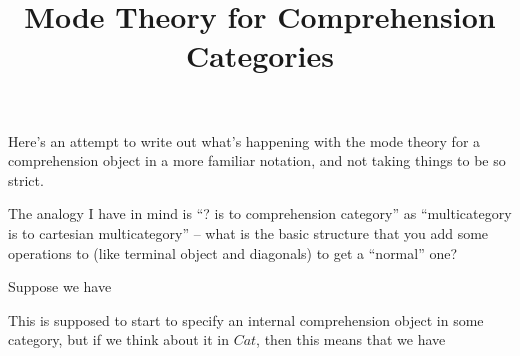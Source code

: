 \documentclass[10pt]{article}
\title{Mode Theory for Comprehension Categories}
\date{}
\theoremstyle{definition}
\let\emptyset\varnothing
\begin{document}
\maketitle

Here's an attempt to write out what's happening with the mode theory for
a comprehension object in a more familiar notation, and not taking
things to be so strict.  

The analogy I have in mind is ``? is to comprehension category'' as
``multicategory is to cartesian multicategory'' -- what is the basic
structure that you add some operations to (like terminal object and
diagonals) to get a ``normal'' one?

Suppose we have
This is supposed to start to specify an internal comprehension object in
some category, but if we think about it in $\mathit{Cat}$, then this
means that we have
\end{document}
